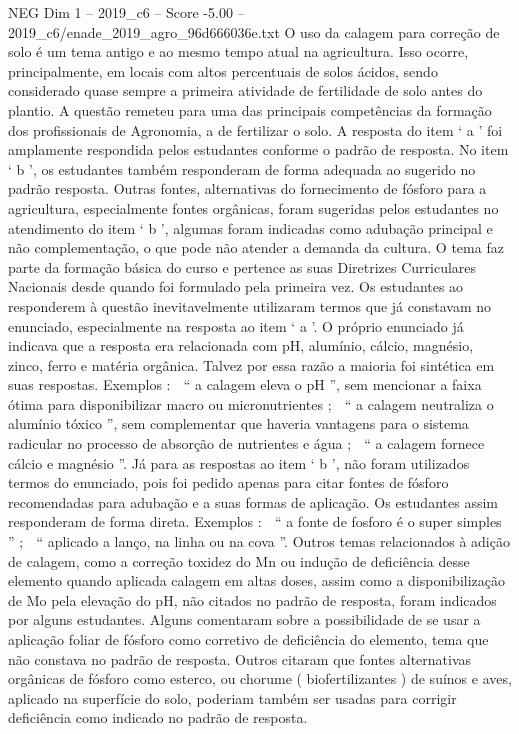 \begin{textsample}{NEG Dim 1 – 2019\_c6 – Score -5.00 – 2019\_c6/enade\_2019\_agro\_96d666036e.txt}
O uso da calagem para correção de solo é um tema antigo e ao mesmo tempo atual na agricultura.
Isso ocorre, principalmente, em locais com altos percentuais de solos ácidos, sendo considerado quase sempre a primeira atividade de fertilidade de solo antes do plantio.
A questão remeteu para uma das principais competências da formação dos profissionais de Agronomia, a de fertilizar o solo.
A resposta do item ‘ a ’ foi amplamente respondida pelos estudantes conforme o padrão de resposta.
No item ‘ b ’, os estudantes também responderam de forma adequada ao sugerido no padrão resposta.
Outras fontes, alternativas do fornecimento de fósforo para a agricultura, especialmente fontes orgânicas, foram sugeridas pelos estudantes no atendimento do item ‘ b ’, algumas foram indicadas como adubação principal e não complementação, o que pode não atender a demanda da cultura.
O tema faz parte da formação básica do curso e pertence as suas Diretrizes Curriculares Nacionais desde quando foi formulado pela primeira vez.
Os estudantes ao responderem à questão inevitavelmente utilizaram termos que já constavam no enunciado, especialmente na resposta ao item ‘ a ’.
O próprio enunciado já indicava que a resposta era relacionada com pH, alumínio, cálcio, magnésio, zinco, ferro e matéria orgânica.
Talvez por essa razão a maioria foi sintética em suas respostas.
Exemplos :  “ a calagem eleva o pH ”, sem mencionar a faixa ótima para disponibilizar macro ou micronutrientes ;  “ a calagem neutraliza o alumínio tóxico ”, sem complementar que haveria vantagens para o sistema radicular no processo de absorção de nutrientes e água ;  “ a calagem fornece cálcio e magnésio ”.
Já para as respostas ao item ‘ b ’, não foram utilizados termos do enunciado, pois foi pedido apenas para citar fontes de fósforo recomendadas para adubação e a suas formas de aplicação.
Os estudantes assim responderam de forma direta.
Exemplos :  “ a fonte de fosforo é o super simples ” ;  “ aplicado a lanço, na linha ou na cova ”.
Outros temas relacionados à adição de calagem, como a correção toxidez do Mn ou indução de deficiência desse elemento quando aplicada calagem em altas doses, assim como a disponibilização de Mo pela elevação do pH, não citados no padrão de resposta, foram indicados por alguns estudantes.
Alguns comentaram sobre a possibilidade de se usar a aplicação foliar de fósforo como corretivo de deficiência do elemento, tema que não constava no padrão de resposta.
Outros citaram que fontes alternativas orgânicas de fósforo como esterco, ou chorume ( biofertilizantes ) de suínos e aves, aplicado na superfície do solo, poderiam também ser usadas para corrigir deficiência como indicado no padrão de resposta.

\end{textsample}
